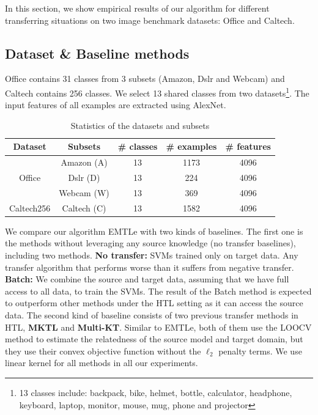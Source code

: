 In this section, we show empirical results of our algorithm for different transferring situations on two image benchmark datasets: Office and Caltech.
\subsection{Dataset \& Baseline methods}
Office contains 31 classes from 3 subsets (Amazon, Dslr and Webcam) and Caltech contains 256 classes. We select 13 shared classes from two datasets\footnote{13 classes include: backpack, bike, helmet, bottle, calculator, headphone, keyboard, laptop, monitor, mouse, mug, phone and projector}. The input features of all examples are extracted using AlexNet\cite{krizhevsky2012imagenet}.
\begin{table}[htbp]
	\centering
	\caption{Statistics of the datasets and subsets}
	\begin{tabular}{|c|c|c|c|c|}
		\hline
		Dataset&Subsets&\# classes &\# examples & \# features\\\hline
		\multirow{3}{*}{Office} & Amazon (A) &13&1173 & 4096\\
		
		& Dslr (D) &13&224 & 4096\\
		& Webcam (W) &13&369 & 4096\\
		\hline
		Caltech256&Caltech (C)&13&1582&4096\\
		\hline
	\end{tabular}%
	\label{tab:class_info}%
\end{table}%
We compare our algorithm EMTLe with two kinds of baselines. The first one is the methods without leveraging any source knowledge (no transfer baselines), including two methods. \textbf{No transfer:} SVMs trained only on target data. Any transfer algorithm that performs worse than it suffers from negative transfer. \textbf{Batch:} We combine the source and target data, assuming that we have full access to all data, to train the SVMs. The result of the Batch method is expected to outperform other methods under the HTL setting as it can access the source data. The second kind of baseline consists of two previous transfer methods in HTL, \textbf{MKTL\cite{jie2011multiclass}} and \textbf{Multi-KT\cite{tommasi2014learning}}. Similar to EMTLe, both of them use the LOOCV method to estimate the relatedness of the source model and target domain, but they use their convex objective function without the $\ell_2$ penalty terms. We use linear kernel for all methods in all our experiments.
